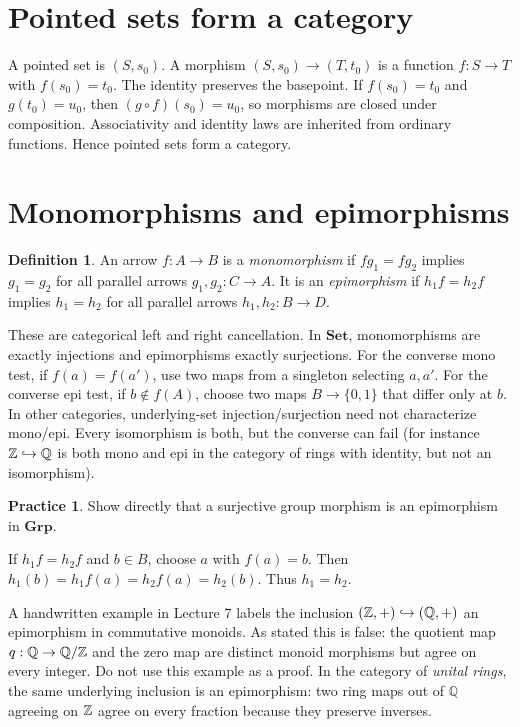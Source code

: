 \documentclass[11pt,openany]{book}
\newcommand{\Q}{\mathbb Q}\newcommand{\R}{\mathbb R}
\theoremstyle{definition}
\newtheorem{definition}[theorem]{Definition}
\newtheorem{exercise}[theorem]{Practice}
\begin{document}
\section{Pointed sets form a category}
A pointed set is $(S,s_0)$. A morphism
$(S,s_0)\to(T,t_0)$ is a function $f:S\to T$ with $f(s_0)=t_0$. The identity preserves the basepoint. If $f(s_0)=t_0$ and $g(t_0)=u_0$, then
$(g\circ f)(s_0)=u_0$, so morphisms are closed under composition. Associativity and identity laws are inherited from ordinary functions. Hence pointed sets form a category.

\section{Monomorphisms and epimorphisms}
\begin{definition}An arrow $f:A\to B$ is a \emph{monomorphism} if $fg_1=fg_2$ implies $g_1=g_2$ for all parallel arrows $g_1,g_2:C\to A$. It is an \emph{epimorphism} if $h_1f=h_2f$ implies $h_1=h_2$ for all parallel arrows $h_1,h_2:B\to D$.\end{definition}
These are categorical left and right cancellation. In $\mathbf{Set}$, monomorphisms are exactly injections and epimorphisms exactly surjections. For the converse mono test, if $f(a)=f(a')$, use two maps from a singleton selecting $a,a'$. For the converse epi test, if $b\notin f(A)$, choose two maps $B\to\{0,1\}$ that differ only at $b$. In other categories, underlying-set injection/surjection need not characterize mono/epi. Every isomorphism is both, but the converse can fail (for instance $\Z\hookrightarrow\Q$ is both mono and epi in the category of rings with identity, but not an isomorphism).
\begin{exercise}Show directly that a surjective group morphism is an epimorphism in $\mathbf{Grp}$.\end{exercise}
\begin{solution}If $h_1f=h_2f$ and $b\in B$, choose $a$ with $f(a)=b$. Then $h_1(b)=h_1f(a)=h_2f(a)=h_2(b)$. Thus $h_1=h_2$.\end{solution}
\begin{warningbox}A handwritten example in Lecture 7 labels the inclusion $(\Z,+)\hookrightarrow(\Q,+)$ an epimorphism in commutative monoids. As stated this is false: the quotient map $q:\Q\to\Q/\Z$ and the zero map are distinct monoid morphisms but agree on every integer. Do not use this example as a proof. In the category of \emph{unital rings}, the same underlying inclusion is an epimorphism: two ring maps out of $\Q$ agreeing on $\mathbb Z$ agree on every fraction because they preserve inverses.\end{warningbox}
\end{document}
